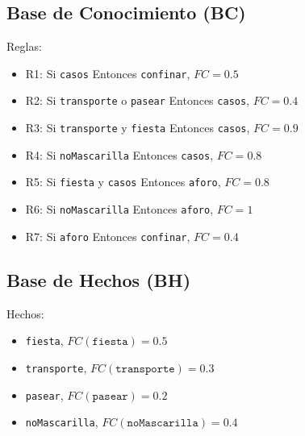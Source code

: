 \subsection{Base de Conocimiento (BC)}
Reglas:
\begin{itemize}
    \item R1: Si \texttt{casos} Entonces \texttt{confinar}, $FC=0.5$
    \item R2: Si \texttt{transporte} o \texttt{pasear} Entonces \texttt{casos}, $FC=0.4$
    \item R3: Si \texttt{transporte} y \texttt{fiesta} Entonces \texttt{casos}, $FC=0.9$
    \item R4: Si \texttt{noMascarilla} Entonces \texttt{casos}, $FC=0.8$
    \item R5: Si \texttt{fiesta} y \texttt{casos} Entonces \texttt{aforo}, $FC=0.8$
    \item R6: Si \texttt{noMascarilla} Entonces \texttt{aforo}, $FC=1$
    \item R7: Si \texttt{aforo} Entonces \texttt{confinar}, $FC=0.4$
\end{itemize}

\subsection{Base de Hechos (BH)}
Hechos:
\begin{itemize}
    \item \texttt{fiesta}, $FC(\texttt{fiesta}) = 0.5$
    \item \texttt{transporte}, $FC(\texttt{transporte}) = 0.3$
    \item \texttt{pasear}, $FC(\texttt{pasear}) = 0.2$
    \item \texttt{noMascarilla}, $FC(\texttt{noMascarilla}) = 0.4$
\end{itemize}
\newpage

